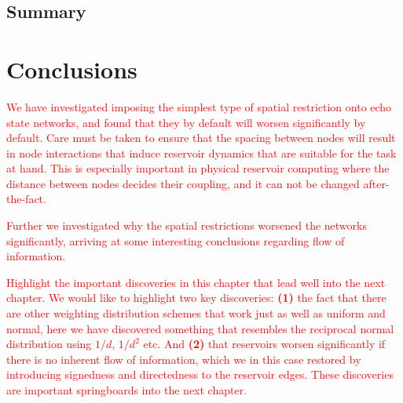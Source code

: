 \subsection{Summary}

\section{Conclusions}

\textcolor{red}{
  We have investigated imposing the simplest type of spatial restriction onto
echo state networks, and found that they by default will worsen significantly by
default. Care must be taken to ensure that the spacing between nodes will result
in node interactions that induce reservoir dynamics that are suitable for the
task at hand. This is especially important in physical reservoir computing where
the distance between nodes decides their coupling, and it can not be changed
after-the-fact.
}

\textcolor{red}{
  Further we investigated why the spatial restrictions worsened the networks
significantly, arriving at some interesting conclusions regarding flow of
information.
}

\textcolor{red}{
  Highlight the important discoveries in this chapter that lead well into the
next chapter. We would like to highlight two key discoveries: \textbf{(1)} the
fact that there are other weighting distribution schemes that work just as well
as uniform and normal, here we have discovered something that resembles the
reciprocal normal distribution using $1/d$, $1/d^2$ etc. And \textbf{(2)} that
reservoirs worsen significantly if there is no inherent flow of information,
which we in this case restored by introducing signedness and directedness to the
reservoir edges. These discoveries are important springboards into the next
chapter.
}


